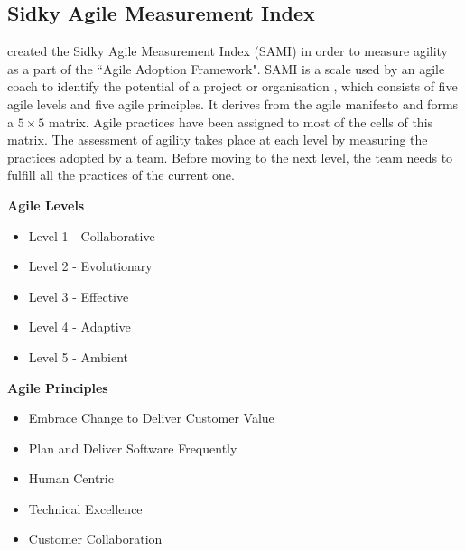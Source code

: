 \subsection{Sidky Agile Measurement Index}
\citet{sidky_dissertation} created the Sidky Agile Measurement Index (SAMI) in order to measure agility as a part of the ``Agile Adoption Framework". SAMI is a scale used by an agile coach to identify the potential of a project or organisation \cite{sidky}, which consists of five agile levels and five agile principles. It derives from the agile manifesto \cite{beck2001agile} and forms a $5\times 5$ matrix. Agile practices have been assigned to most of the cells of this matrix. The assessment of agility takes place at each level by measuring the practices adopted by a team. Before moving to the next level, the team needs to fulfill all the practices of the current one.

\begin{minipage}[t]{0.35\linewidth}
    \textbf{Agile Levels}
    \begin{itemize}
    \item{Level 1 - Collaborative}
    \item{Level 2 - Evolutionary}
    \item{Level 3 - Effective}
    \item{Level 4 - Adaptive}
    \item{Level 5 - Ambient}
    \end{itemize}
    \end{minipage}
    \begin{minipage}[t]{0.6\linewidth}
    \textbf{Agile Principles}
    \begin{itemize}
    \item{Embrace Change to Deliver Customer Value}
    \item{Plan and Deliver Software Frequently}
    \item{Human Centric}
    \item{Technical Excellence}
    \item{Customer Collaboration}
    \end{itemize}
\end{minipage}

